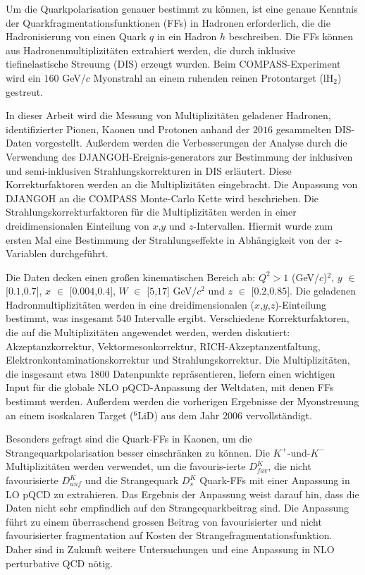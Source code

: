 Um die Quarkpolarisation genauer bestimmt zu können, ist eine genaue Kenntnis der Quarkfragmentationsfunktionen (FFs) in Hadronen erforderlich, die die Hadronisierung von einen Quark $q$ in ein Hadron $h$ beschreiben. Die FFs können aus Hadronenmultiplizitäten extrahiert werden, die durch inklusive tiefinelastische Streuung (DIS) erzeugt wurden. Beim COMPASS-Experiment wird ein $160$ GeV/$c$ Myonstrahl an einem ruhenden reinen Protontarget (lH$_2$) gestreut.

In dieser Arbeit wird die Messung von Multiplizitäten geladener Hadronen, identifizierter Pionen, Kaonen und Protonen anhand der $2016$ gesammelten DIS-Daten vorgestellt. Außerdem werden die Verbesserungen der Analyse durch die Verwendung des DJANGOH-Ereignis-generators zur Bestimmung der inklusiven und semi-inklusiven Strahlungskorrekturen in DIS erläutert. Diese Korrekturfaktoren werden an die Multiplizitäten eingebracht. Die Anpassung von DJANGOH an die COMPASS Monte-Carlo Kette wird beschrieben. Die Strahlungskorrekturfaktoren für die Multiplizitäten werden in einer dreidimensionalen Einteilung von $x$,$y$ und $z$-Intervallen. Hiermit wurde zum ersten Mal eine Bestimmung der Strahlungseffekte in Abhängigkeit von der $z$-Variablen durchgeführt.

Die Daten decken einen großen kinematischen Bereich ab: $Q^2 > 1$ (GeV/$c$)$^2$, $y$ $\in$ [$0.1$,$0.7$], $x$ $\in$ [$0.004$,$0.4$], $W$ $\in$ [$5$,$17$] GeV/$c^2$ und $z$ $\in$ [$0.2$,$0.85$]. Die geladenen Hadronmultiplizitäten werden in eine dreidimensionalen ($x$,$y$,$z$)-Einteilung bestimmt, was insgesamt 540 Intervalle ergibt. Verschiedene Korrekturfaktoren, die auf die Multiplizitäten angewendet werden, werden diskutiert: Akzeptanzkorrektur, Vektormesonkorrektur, RICH-Akzeptanzentfaltung, Elektronkontaminationskorrektur und Strahlungskorrektur. Die Multiplizitäten, die insgesamt etwa 1800 Datenpunkte repräsentieren, liefern einen wichtigen Input für die globale NLO pQCD-Anpassung der Weltdaten, mit denen FFs bestimmt werden. Außerdem werden die vorherigen Ergebnisse der Myonstreuung an einem isoskalaren Target ($^6$LiD) aus dem Jahr $2006$ vervollständigt.

Besonders gefragt sind die Quark-FFs in Kaonen, um die Strangequarkpolarisation besser einschränken zu können. Die $K^+$-und-$K^-$ Multiplizitäten werden verwendet, um die  favouris-ierte $D^{K}_{fav}$, die nicht favourisierte $D^{K}_{unf}$ und die Strangequark $D^{K}_{s}$ Quark-FFs mit einer Anpassung in LO pQCD zu extrahieren. Das Ergebnis der Anpassung weist darauf hin, dass die Daten nicht sehr empfindlich auf den Strangequarkbeitrag sind. Die Anpassung führt zu einem überraschend
grossen Beitrag von favourisierter und nicht favourisierter fragmentation auf Kosten der Strangefragmentationsfunktion. Daher sind in Zukunft weitere Untersuchungen und eine Anpassung in NLO perturbative QCD nötig.

